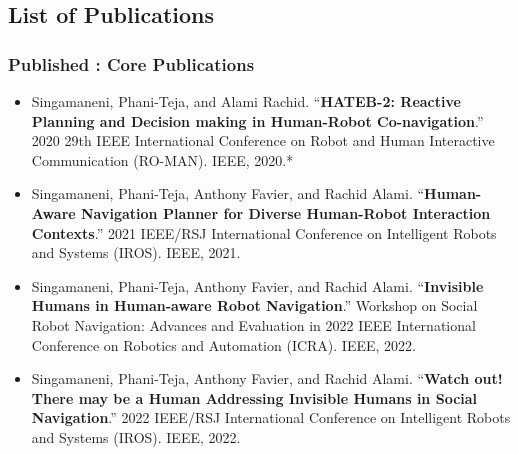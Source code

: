 \subsection*{List of Publications}
\subsubsection*{Published : Core Publications}
\begin{itemize}
    \item Singamaneni, Phani-Teja, and Alami Rachid. ``\textbf{HATEB-2: Reactive Planning and Decision making in Human-Robot Co-navigation}.'' 2020 29th IEEE International Conference on Robot and Human Interactive Communication (RO-MAN). IEEE, 2020.* \let\thefootnote\relax{}
    
    \item Singamaneni, Phani-Teja, Anthony Favier, and Rachid Alami. ``\textbf{Human-Aware Navigation Planner for Diverse Human-Robot Interaction Contexts}.'' 2021 IEEE/RSJ International Conference on Intelligent Robots and Systems (IROS). IEEE, 2021.
    
    \item Singamaneni, Phani-Teja, Anthony Favier, and Rachid Alami. ``\textbf{Invisible Humans in Human-aware Robot Navigation}.'' Workshop on Social Robot Navigation: Advances and Evaluation in 2022 IEEE International Conference on Robotics and Automation (ICRA). IEEE, 2022.

    \item Singamaneni, Phani-Teja, Anthony Favier, and Rachid Alami. ``\textbf{Watch out! There may be a Human Addressing Invisible Humans in Social Navigation}.'' 2022 IEEE/RSJ International Conference on Intelligent Robots and Systems (IROS). IEEE, 2022.

\end{itemize}
